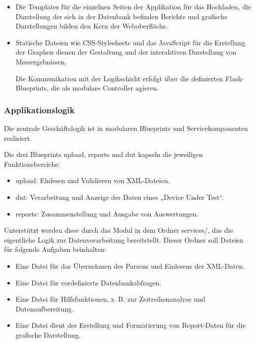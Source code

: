 \begin{itemize}

\item
Die Templates für die einzelnen Seiten der Applikation für das Hochladen, die Darstellung der sich in der Datenbank befinden Berichte
und grafische Darstellungen bilden den Kern der Weboberfläche.

\item
Statische Dateien wie CSS-Stylesheets und das JavaScript für die Erstellung der Graphen dienen der Gestaltung und der
interaktiven Darstellung von Messergebnissen.

Die Kommunikation mit der Logikschicht erfolgt über die definierten Flask-Blueprints, die als modulare Controller agieren.

\end{itemize}

\subsubsection{Applikationslogik}

Die zentrale Geschäftslogik ist in modularen Blueprints und Servicekomponenten realisiert.

Die drei Blueprints upload, reports und dut kapseln die jeweiligen Funktionsbereiche:

\begin{itemize}

\item
upload: Einlesen und Validieren von XML-Dateien.

\item
dut: Verarbeitung und Anzeige der Daten eines „Device Under Test“.

\item
reports: Zusammenstellung und Ausgabe von Auswertungen.

\end{itemize}

Unterstützt werden diese durch das Modul in dem Ordner services/, das die eigentliche Logik zur Datenverarbeitung bereitstellt.
Dieser Ordner soll Dateien für folgende Aufgaben beinhalten:

\begin{itemize}

\item
Eine Datei für das Übernehmen des Parsens und Einlesens der XML-Daten.

\item
Eine Datei für vordefinierte Datenbankabfragen.

\item
Eine Datei für Hilfsfunktionen, z. B. zur Zeitreihenanalyse und Datenaufbereitung.

\item
Eine Datei dient der Erstellung und Formatierung von Report-Daten für die grafische Darstellung.

\end{itemize}


